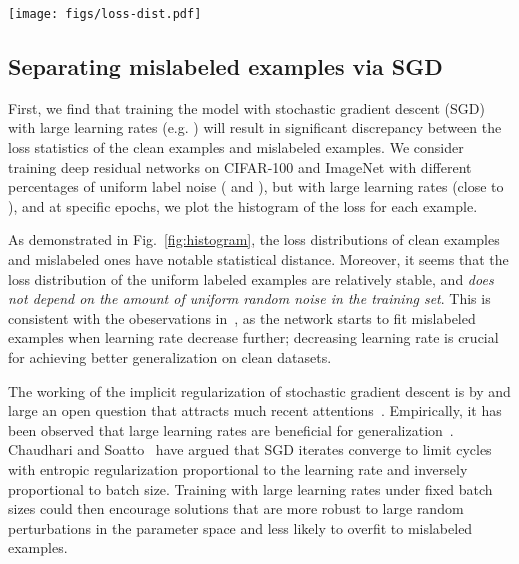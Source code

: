 \documentclass[a4paper,11pt]{article}
\begin{document}
\begin{figure*}[t]
\begin{center}
\texttt{[image: figs/loss-dist.pdf]}
\caption{Histogram of the distributions of losses, where ``normal'', ``noise'', and ``simulated'' denote (real) examples with clean labels, (real) examples with uniform random labels and the counterfactual model  respectively.  matches the loss distribution of noisy examples, which have higher loss than clean ones;  depends only on the network parameters.}
\label{fig:histogram}
\end{center}
\end{figure*}





\subsection{Separating mislabeled examples via SGD}



First, we find that training the model with stochastic gradient descent (SGD) with large learning rates (e.g. ) will result in significant discrepancy between the loss statistics of the clean examples and mislabeled examples. We consider training deep residual networks on CIFAR-100 and ImageNet with different percentages of uniform label noise ( and ), but with large learning rates (close to ), and at specific epochs, we plot the histogram of the loss for each example. 

As demonstrated in Fig.~\ref{fig:histogram}, the loss distributions of clean examples and mislabeled ones have notable statistical distance. Moreover, it seems that the loss distribution of the uniform labeled examples are relatively stable, and \textit{does not depend on the amount of uniform random noise in the training set}.
This is consistent with the obeservations in~\cite{zhang2016understanding}, as the network starts to fit mislabeled examples when learning rate decrease further; decreasing learning rate is crucial for achieving better generalization on clean datasets.

The working of the implicit regularization of stochastic gradient descent is by and large an open question that attracts much recent attentions~\cite{neyshabur2017implicit,li2017algorithmic,du2018algorithmic,mandt2017stochastic}. Empirically, it has been observed that large learning rates are beneficial for generalization~\cite{kleinberg2018an}. Chaudhari and Soatto~\cite{chaudhari2018stochastic} have argued that SGD iterates converge to limit cycles with entropic regularization proportional to the learning rate and inversely proportional to batch size. Training with large learning rates under fixed batch sizes could then encourage solutions that are more robust to large random perturbations in the parameter space and less likely to overfit to mislabeled examples.
\end{document}
